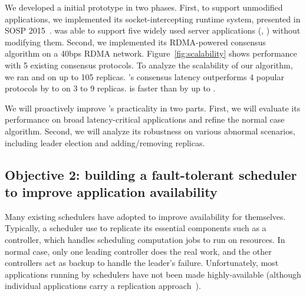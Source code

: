 
 We developed a \falcon initial prototype in two 
phases. First, to support unmodified applications, we implemented its 
socket-intercepting runtime system, presented in SOSP 2015~\cite{crane:sosp15}. 
\falcon was able to support five widely used server applications (\eg, \mysql) 
without modifying them. Second, we implemented its RDMA-powered consensus 
algorithm on a 40bps RDMA network. Figure~\ref{fig:scalability} shows \falcon 
performance with 5 existing consensus protocols. To analyze the scalability
of our algorithm, we ran \falcon and \dare on up to 105 replicas. \falcon's 
consensus latency outperforms 4 popular \paxos  protocols by \comptradlow to 
\comptradhigh on 3 to 9 replicas. \falcon is  faster than \dare by up to 
\fasterDARE.



 We will proactively improve \falcon's practicality in two 
parts. First, we will evaluate its performance on broad latency-critical 
applications and refine the normal case algorithm. Second, we will analyze 
its robustness on various abnormal scenarios, including leader election and 
adding/removing replicas.

\vspace{-.15in}\subsection{Objective 2: 
building a fault-tolerant scheduler to improve 
application availability}\label{sec:scheduler}\vspace{-.075in}

Many existing schedulers have adopted \paxos to improve availability for 
themselves. Typically, a scheduler use \paxos to replicate its essential 
components such as a controller, which handles scheduling computation jobs 
to run on resources. In normal case, only one leading controller does the real 
work, and the other controllers act as backup to handle the leader's failure. 
Unfortunately, most applications running by schedulers have not been made 
highly-available (although individual applications carry a replication 
approach~\cite{mapreduce,dolly:nsdi13}).

